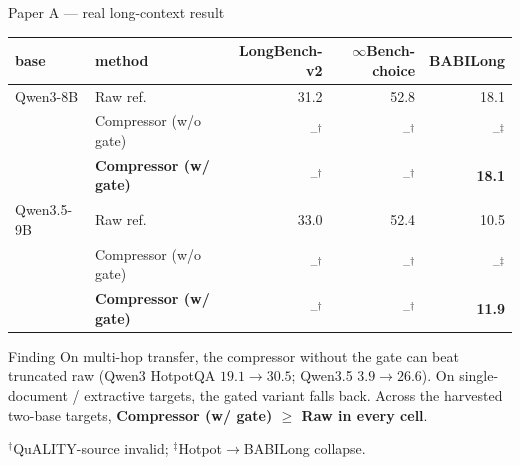 \begin{frame}{Paper A --- real long-context result}
  \centering\scriptsize
  \begin{tabular}{llrrr}
  \toprule
  base & method & LongBench-v2 & $\infty$Bench-choice & BABILong \\
  \midrule
  Qwen3-8B & Raw ref. & 31.2 & 52.8 & 18.1 \\
            & Compressor (w/o gate) & --$^\dagger$ & --$^\dagger$ & --$^\ddagger$ \\
            & \textbf{Compressor (w/ gate)} & --$^\dagger$ & --$^\dagger$ & \textbf{18.1} \\
  Qwen3.5-9B & Raw ref. & 33.0 & 52.4 & 10.5 \\
              & Compressor (w/o gate) & --$^\dagger$ & --$^\dagger$ & --$^\ddagger$ \\
              & \textbf{Compressor (w/ gate)} & --$^\dagger$ & --$^\dagger$ & \textbf{11.9} \\
  \bottomrule
  \end{tabular}
  \vspace{0.4em}
  \begin{block}{Finding}
    \footnotesize On multi-hop transfer, the compressor without the gate can beat truncated raw
    (Qwen3 HotpotQA $19.1\to30.5$; Qwen3.5 $3.9\to26.6$).
    On single-document / extractive targets, the gated variant falls back.
    Across the harvested two-base targets, \textbf{Compressor (w/ gate) $\ge$ Raw in every cell}.
  \end{block}
  \footnotesize $^\dagger$QuALITY-source invalid; $^\ddagger$Hotpot$\to$BABILong collapse.
\end{frame}

